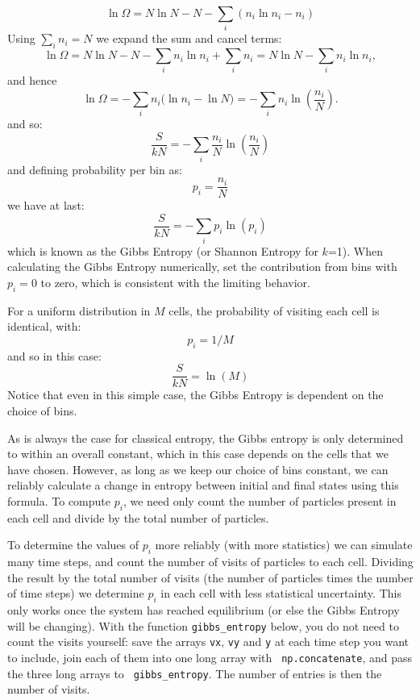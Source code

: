 \documentclass[12pt]{article}
\begin{document}
$$\ln \Omega =  N \ln N - N - \sum_i (n_i \ln n_i - n_i)$$
Using $\sum_i n_i = N$ we expand the sum and cancel terms:
\[
  \ln\Omega = N\ln N - N - \sum_i n_i\ln n_i + \sum_i n_i
           = N\ln N - \sum_i n_i\ln n_i,
\]
and hence
\[
  \ln\Omega = -\sum_i n_i\big(\ln n_i - \ln N\big)
             = -\sum_i n_i\ln\!\left(\frac{n_i}{N}\right).
\]
and so:
$$\frac{S}{kN} = - \sum_i \frac{n_i}{N} \ln \left( \frac{n_i}{N} \right) $$
and defining probability per bin as:
$$p_i = \frac{n_i}{N}$$
we have at last:
\begin{equation}
\frac{S}{kN} = - \sum_i p_i \ln ( p_i )
\end{equation}
which is known as the Gibbs Entropy (or Shannon Entropy for $k$=1).
When calculating the Gibbs Entropy numerically, set the contribution
from bins with $p_i=0$ to zero, which is consistent with the limiting
behavior.

For a uniform distribution in $M$ cells, the probability of visiting each cell is identical, with:
$$p_i = 1/M$$
and so in this case:
\begin{equation}
\frac{S}{kN} = \ln ( M )
\end{equation}
Notice that even in this simple case, the Gibbs Entropy is dependent
on the choice of bins.

As is always the case for classical entropy, the Gibbs entropy is only
determined to within an overall constant, which in this case depends
on the cells that we have chosen.  However, as long as we keep our
choice of bins constant, we can reliably calculate a change in entropy
between initial and final states using this formula.  To compute
$p_i$, we need only count the number of particles present in each cell
and divide by the total number of particles.

To determine the values of $p_i$ more reliably (with more statistics)
we can simulate many time steps, and count the number of visits of
particles to each cell.  Dividing the result by the total number of
visits (the number of particles times the number of time steps) we
determine $p_i$ in each cell with less statistical uncertainty.  This
only works once the system has reached equilibrium (or else the Gibbs
Entropy will be changing).  With the function {\tt gibbs\_entropy}
below, you do not need to count the visits yourself: save the arrays
{\tt vx}, {\tt vy} and {\tt y} at each time step you want to
include, join each of them into one long array with {\tt
  np.concatenate}, and pass the three long arrays to {\tt
  gibbs\_entropy}.  The number of entries is then the number of visits.
\end{document}
